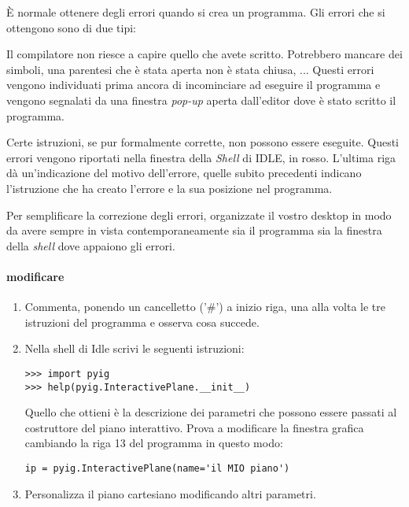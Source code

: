 \begin{osservazione}

 È normale ottenere degli errori quando si crea un programma. Gli errori che si 
ottengono sono di due tipi:
\begin{description} [noitemsep]
 \item [Sintattici]
 Il compilatore non riesce a capire quello che avete scritto. Potrebbero 
mancare dei simboli, una parentesi che è stata aperta non è stata chiusa, ...
Questi errori vengono individuati prima ancora di incominciare ad eseguire il 
programma e vengono segnalati da una finestra \emph{pop-up} aperta 
dall'editor dove è stato scritto il programma.
 \item [Semantici]
 Certe istruzioni, se pur formalmente corrette, non possono essere eseguite.
 Questi errori vengono riportati nella finestra della \emph{Shell} di IDLE, in 
rosso.
L'ultima riga dà un'indicazione del motivo dell'errore, quelle subito 
precedenti indicano l'istruzione che ha creato l'errore e la sua posizione nel 
programma.
\end{description}

Per semplificare la correzione degli errori, organizzate il vostro desktop in 
modo da avere sempre in vista contemporaneamente sia il programma sia la 
finestra della \emph{shell} dove appaiono gli errori.

\end{osservazione}

\paragraph{modificare}
\begin{enumerate} [noitemsep]
 \item Commenta, ponendo un cancelletto ('\#') a inizio riga, una alla volta le 
tre istruzioni del programma e osserva cosa succede.
 \item Nella shell di Idle scrivi le seguenti istruzioni:
 \begin{lstlisting}
>>> import pyig
>>> help(pyig.InteractivePlane.__init__)
 \end{lstlisting}
Quello che ottieni è la descrizione dei parametri che possono essere passati al 
costruttore del piano interattivo.
Prova a modificare la finestra grafica cambiando la riga 13 del programma in 
questo modo:
 \begin{lstlisting}
ip = pyig.InteractivePlane(name='il MIO piano')
 \end{lstlisting}
 \item Personalizza il piano cartesiano modificando altri parametri.
\end{enumerate}

